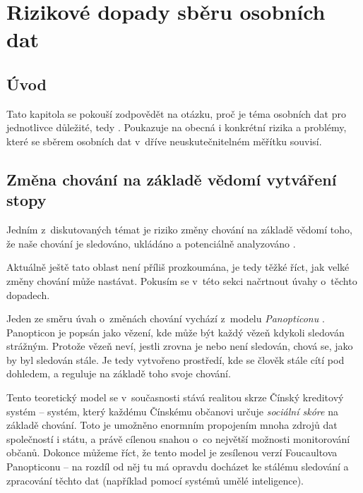 \chapter{Rizikové dopady sběru osobních dat}

\section{Úvod}
Tato kapitola se pokouší zodpovědět na otázku, proč je téma osobních dat pro jednotlivce důležité, tedy . Poukazuje na obecná i konkrétní rizika a problémy, které se sběrem osobních dat v~dříve neuskutečnitelném měřítku souvisí. 


\section{Změna chování na základě vědomí vytváření stopy}

Jedním z~diskutovaných témat je riziko změny chování na základě vědomí toho, že naše chování je sledováno, ukládáno a potenciálně analyzováno \citep{behavior-changes}.

Aktuálně ještě tato oblast není příliš prozkoumána, je tedy těžké říct, jak velké změny chování může nastávat. Pokusím se v~této sekci načrtnout úvahy o~těchto dopadech.

Jeden ze směru úvah o~změnách chování vychází z~modelu \textit{Panopticonu} \citep{panopticon}. Panopticon je popsán jako vězení, kde může být každý vězeň kdykoli sledován strážným. Protože vězeň neví, jestli zrovna je nebo není sledován, chová se, jako by byl sledován stále. Je tedy vytvořeno prostředí, kde se člověk stále cítí pod dohledem, a reguluje na základě toho svoje chování.

Tento teoretický model se v~současnosti stává realitou skrze Čínský kreditový systém -- systém, který každému Čínskému občanovi určuje \textit{sociální skóre} na základě chování. Toto je umožněno enormním propojením mnoha zdrojů dat společností i státu, a právě cílenou snahou o~co největší možnosti monitorování občanů. Dokonce můžeme říct, že tento model je zesílenou verzí Foucaultova Panopticonu -- na rozdíl od něj tu má opravdu docházet ke stálému sledování a zpracování těchto dat (například pomocí systémů umělé inteligence).

